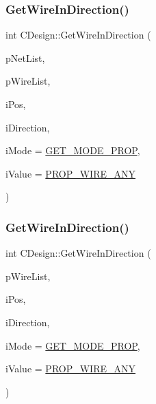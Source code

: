 \mbox{\label{classCDesign_a0b7936130fc4fb79009bfaf1df97e76e}} 
\subsubsection{\texorpdfstring{GetWireInDirection()}{GetWireInDirection()}\hspace{0.1cm}{\footnotesize\ttfamily [1/2]}}
{\footnotesize\ttfamily int C\+Design\+::\+Get\+Wire\+In\+Direction (\begin{DoxyParamCaption}\item[{vector$<$ \mbox{\hyperlink{classCNet}{C\+Net}} $\ast$ $>$ $\ast$}]{p\+Net\+List,  }\item[{vector$<$ \mbox{\hyperlink{classCWire}{C\+Wire}} $\ast$ $>$ $\ast$}]{p\+Wire\+List,  }\item[{int}]{i\+Pos,  }\item[{int}]{i\+Direction,  }\item[{int}]{i\+Mode = {\ttfamily \mbox{\hyperlink{BoxRouter_8h_a678c4c2628bee05b15999bb00ded44d3}{G\+E\+T\+\_\+\+M\+O\+D\+E\+\_\+\+P\+R\+OP}}},  }\item[{int}]{i\+Value = {\ttfamily \mbox{\hyperlink{BoxRouter_8h_a3190814b5494277cd30ff3d03c8d4058}{P\+R\+O\+P\+\_\+\+W\+I\+R\+E\+\_\+\+A\+NY}}} }\end{DoxyParamCaption})}

\mbox{\label{classCDesign_a569c1b0aa4defe50ebb89a5a4054631c}} 
\subsubsection{\texorpdfstring{GetWireInDirection()}{GetWireInDirection()}\hspace{0.1cm}{\footnotesize\ttfamily [2/2]}}
{\footnotesize\ttfamily int C\+Design\+::\+Get\+Wire\+In\+Direction (\begin{DoxyParamCaption}\item[{vector$<$ \mbox{\hyperlink{classCWire}{C\+Wire}} $\ast$ $>$ $\ast$}]{p\+Wire\+List,  }\item[{int}]{i\+Pos,  }\item[{int}]{i\+Direction,  }\item[{int}]{i\+Mode = {\ttfamily \mbox{\hyperlink{BoxRouter_8h_a678c4c2628bee05b15999bb00ded44d3}{G\+E\+T\+\_\+\+M\+O\+D\+E\+\_\+\+P\+R\+OP}}},  }\item[{int}]{i\+Value = {\ttfamily \mbox{\hyperlink{BoxRouter_8h_a3190814b5494277cd30ff3d03c8d4058}{P\+R\+O\+P\+\_\+\+W\+I\+R\+E\+\_\+\+A\+NY}}} }\end{DoxyParamCaption})}

